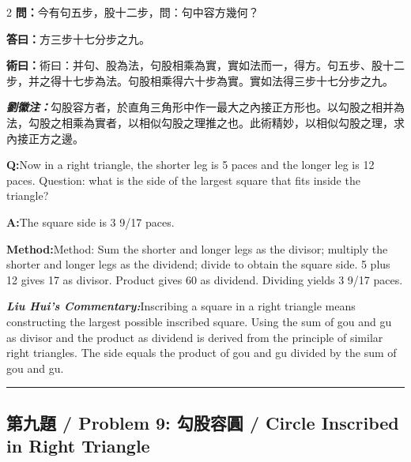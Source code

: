 \documentclass[11pt,a4paper]{article}
\newcommand{\cnwen}{\textcolor{cnlabelfg}{\textbf{問：}}}
\newcommand{\cnda}{\textbf{答曰：}}
\newcommand{\cnshu}{\textcolor{cnlabelfg}{\textbf{術曰：}}}
\newcommand{\cnzhu}{\textcolor{commentarycolor}{\textit{\textbf{劉徽注：}}}}
\newcommand{\enwen}{\textcolor{enlabelfg}{\textbf{Q:}}}
\newcommand{\enda}{\textcolor{enlabelfg}{\textbf{A:}}}
\newcommand{\enshu}{\textcolor{enlabelfg}{\textbf{Method:}}}
\newcommand{\enzhu}{\textcolor{enlabelfg}{\textit{\textbf{Liu Hui's Commentary:}}}}
\begin{document}
\begin{paracol}{2}
\switchcolumn[0]
\cnwen 今有句五步，股十二步，問：句中容方幾何？

\cnda 方三步十七分步之九。

\cnshu 術曰：并句、股為法，句股相乘為實，實如法而一，得方。句五步、股十二步，并之得十七步為法。句股相乘得六十步為實。實如法得三步十七分步之九。

\cnzhu 勾股容方者，於直角三角形中作一最大之內接正方形也。以勾股之相并為法，勾股之相乘為實者，以相似勾股之理推之也。此術精妙，以相似勾股之理，求內接正方之邊。

\switchcolumn[1]
\enwen Now in a right triangle, the shorter leg is 5 paces and the longer leg is 12 paces. Question: what is the side of the largest square that fits inside the triangle?

\enda The square side is 3 9/17 paces.

\enshu Method: Sum the shorter and longer legs as the divisor; multiply the shorter and longer legs as the dividend; divide to obtain the square side. 5 plus 12 gives 17 as divisor. Product gives 60 as dividend. Dividing yields 3 9/17 paces.

\enzhu Inscribing a square in a right triangle means constructing the largest possible inscribed square. Using the sum of gou and gu as divisor and the product as dividend is derived from the principle of similar right triangles. The side equals the product of gou and gu divided by the sum of gou and gu.
\end{paracol}

\bigskip\hrule\bigskip

\subsection{第九題 / Problem 9: 勾股容圓 / Circle Inscribed in Right Triangle}
\end{document}
